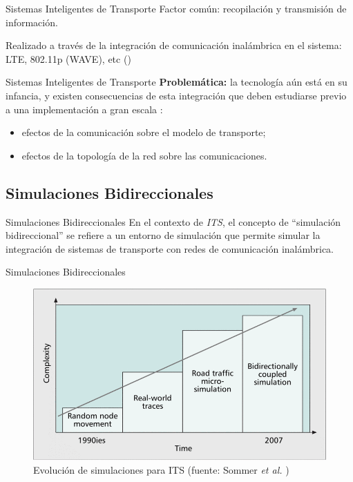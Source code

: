 \documentclass[aspectratio=169]{beamer}
\begin{document}
\begin{frame}{Sistemas Inteligentes de Transporte}
Factor común: recopilación y transmisión de información.

Realizado a través de la integración de comunicación inalámbrica en el sistema: LTE, 802.11p (WAVE), etc (\autocite{80211dailey,80211wave,80215vanet,dar2010wireless})
\end{frame}

\begin{frame}{Sistemas Inteligentes de Transporte}
\textbf{Problemática:} la tecnología aún está en su infancia, y existen consecuencias de esta integración que deben estudiarse previo a una implementación a gran escala \autocite{sommer2008need}:
\begin{itemize}
    \item efectos de la comunicación sobre el modelo de transporte;
    \item efectos de la topología de la red sobre las comunicaciones.
\end{itemize}
\end{frame}

\subsection{Simulaciones Bidireccionales}

\begin{frame}{Simulaciones Bidireccionales}
En el contexto de \emph{ITS}, el concepto de ``simulación bidireccional'' se refiere a un entorno de simulación que permite simular la integración de sistemas de transporte con redes de comunicación inalámbrica.
\end{frame}

\begin{frame}{Simulaciones Bidireccionales}
\begin{figure}
    \centering
    \includegraphics[width=\textwidth]{figuras/evolution_bidirectional_sim_sommerdressler.png}
    \caption{Evolución de simulaciones para ITS (fuente: Sommer \emph{et al.} \autocite{sommer_dressler2})}
    \label{fig:bidirsimulation_evol}
\end{figure}
\end{frame}
\end{document}
